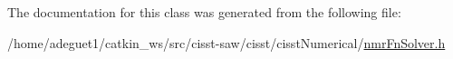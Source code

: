 The documentation for this class was generated from the following file\-:\begin{DoxyCompactItemize}
\item 
/home/adeguet1/catkin\-\_\-ws/src/cisst-\/saw/cisst/cisst\-Numerical/\hyperlink{nmr_fn_solver_8h}{nmr\-Fn\-Solver.\-h}\end{DoxyCompactItemize}
